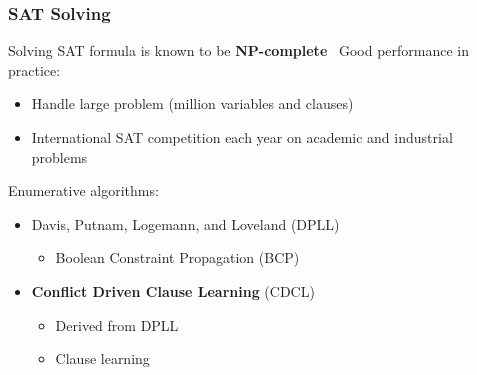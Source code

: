 \documentclass{beamer}
\begin{document}
\begin{frame}
\frametitle{SAT Solving}

	Solving SAT formula is known to be \textbf{NP-complete}~\cite{cook1971complexity}
	\vfill
	Good performance in practice:
	\begin{itemize}
		\item Handle large problem (million variables and clauses)
		\item International SAT competition each year on academic and industrial problems
	\end{itemize}
\vfill
	Enumerative algorithms:
	\begin{itemize}
		\item Davis, Putnam, Logemann, and Loveland (DPLL)~\cite{dpll_62}
		\begin{itemize}
			\item Boolean Constraint Propagation (BCP)
		\end{itemize}
	
		\item \textbf{Conflict Driven Clause Learning} (CDCL)~\cite{marques1999grasp}
		\begin{itemize}
			\item Derived from DPLL
			\item Clause learning
		\end{itemize}
	\end{itemize}

\end{frame}
\end{document}
